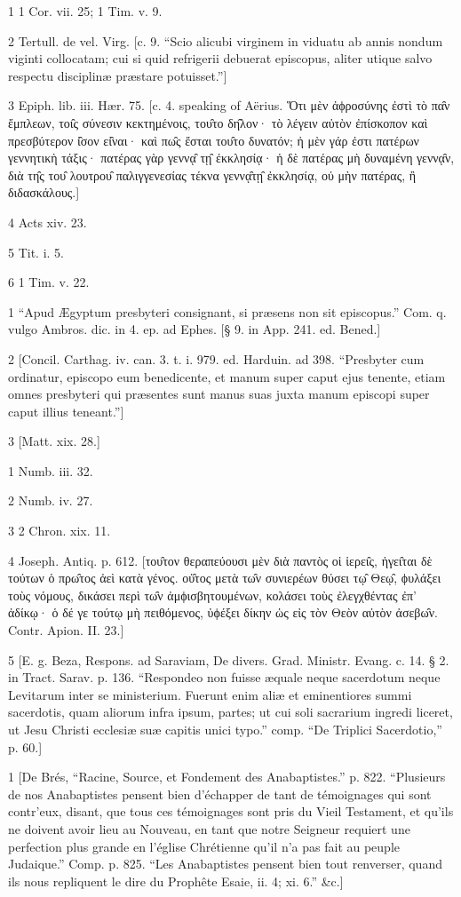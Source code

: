 1
1 Cor. vii. 25; 1 Tim. v. 9.

2
Tertull. de vel. Virg. [c. 9. “Scio alicubi virginem in viduatu ab annis nondum viginti collocatam; cui si quid refrigerii debuerat episcopus, aliter utique salvo respectu disciplinæ præstare potuisset.”]

3
Epiph. lib. iii. Hær. 75. [c. 4. speaking of Aërius. Ὅτι μὲν ἀϕροσύνης ἐστὶ τὸ πα̑ν ἔμπλεων, τοι̑ς σύνεσιν κεκτημένοις, του̑το δη̑λον· τὸ λέγειν αὐτὸν ἐπίσκοπον καὶ πρεσβύτερον ἰ̑σον εἰ̑ναι· καὶ πω̑ς ἔσται του̑το δυνατόν; ἡ μὲν γάρ ἐστι πατέρων γεννητικὴ τάξις· πατέρας γὰρ γεννᾳ̑ τῃ̑ ἐκκλησίᾳ· ἡ δὲ πατέρας μὴ δυναμένη γεννᾳ̑ν, διὰ τη̑ς του̑ λουτρου̑ παλιγγενεσίας τέκνα γεννᾳ̑τῃ̑ ἐκκλησίᾳ, οὐ μὴν πατέρας, ἢ διδασκάλους.]

4
Acts xiv. 23.

5
Tit. i. 5.

6
1 Tim. v. 22.

1
“Apud Ægyptum presbyteri consignant, si præsens non sit episcopus.” Com. q. vulgo Ambros. dic. in 4. ep. ad Ephes. [§ 9. in App. 241. ed. Bened.]

2
[Concil. Carthag. iv. can. 3. t. i. 979. ed. Harduin. ad 398. “Presbyter cum ordinatur, episcopo eum benedicente, et manum super caput ejus tenente, etiam omnes presbyteri qui præsentes sunt manus suas juxta manum episcopi super caput illius teneant.”]

3
[Matt. xix. 28.]

1
Numb. iii. 32.

2
Numb. iv. 27.

3
2 Chron. xix. 11.

4
Joseph. Antiq. p. 612. [του̑τον θεραπεύουσι μὲν διὰ παντὸς οἱ ἱερει̑ς, ἡγει̑ται δὲ τούτων ὁ πρω̑τος ἀεὶ κατὰ γένος. οὑ̑τος μετὰ τω̑ν συνιερέων θύσει τῳ̑ Θεῳ̑, ϕυλάξει τοὺς νόμους, δικάσει περὶ τω̑ν ἀμϕισβητουμένων, κολάσει τοὺς ἐλεγχθέντας ἐπ’ ἀδίκῳ· ὁ δέ γε τούτῳ μὴ πειθόμενος, ὑϕέξει δίκην ὡς εἰς τὸν Θεὸν αὐτὸν ἀσεβω̑ν. Contr. Apion. II. 23.]

5
[E. g. Beza, Respons. ad Saraviam, De divers. Grad. Ministr. Evang. c. 14. § 2. in Tract. Sarav. p. 136. “Respondeo non fuisse æquale neque sacerdotum neque Levitarum inter se ministerium. Fuerunt enim aliæ et eminentiores summi sacerdotis, quam aliorum infra ipsum, partes; ut cui soli sacrarium ingredi liceret, ut Jesu Christi ecclesiæ suæ capitis unici typo.” comp. “De Triplici Sacerdotio,” p. 60.]

1
[De Brés, “Racine, Source, et Fondement des Anabaptistes.” p. 822. “Plusieurs de nos Anabaptistes pensent bien d’échapper de tant de témoignages qui sont contr’eux, disant, que tous ces témoignages sont pris du Vieil Testament, et qu’ils ne doivent avoir lieu au Nouveau, en tant que notre Seigneur requiert une perfection plus grande en l’église Chrétienne qu’il n’a pas fait au peuple Judaique.” Comp. p. 825. “Les Anabaptistes pensent bien tout renverser, quand ils nous repliquent le dire du Prophête Esaie, ii. 4; xi. 6.” &c.]

